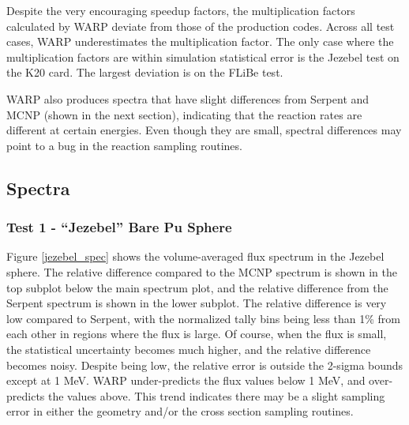\documentclass[preprint,12pt]{elsarticle}
\begin{document}
Despite the very encouraging speedup factors, the multiplication factors calculated by WARP deviate from those of the production codes.  Across all test cases, WARP underestimates the multiplication factor.  The only case where the multiplication factors are within simulation statistical error is the Jezebel test on the K20 card.  The largest deviation is on the FLiBe test.  

WARP also produces spectra that have slight differences from Serpent and MCNP (shown in the next section), indicating that the reaction rates are different at certain energies.  Even though they are small, spectral differences may point to a bug in the reaction sampling routines.  


\subsection{Spectra}

\subsubsection{Test 1 - ``Jezebel'' Bare Pu Sphere}

Figure \ref{jezebel_spec} shows the volume-averaged flux spectrum in the Jezebel sphere.  The relative difference compared to the MCNP spectrum is shown in the top subplot below the main spectrum plot, and the relative difference from the Serpent spectrum is shown in the lower subplot.  The relative difference is very low compared to Serpent, with the normalized tally bins being less than 1\% from each other in regions where the flux is large.  Of course, when the flux is small, the statistical uncertainty becomes much higher, and the relative difference becomes noisy.   Despite being low, the relative error is outside the 2-sigma bounds except at 1 MeV.  WARP under-predicts the flux values below 1 MeV, and over-predicts the values above.  This trend indicates there may be a slight sampling error in either the geometry and/or the cross section sampling routines. 
\end{document}
